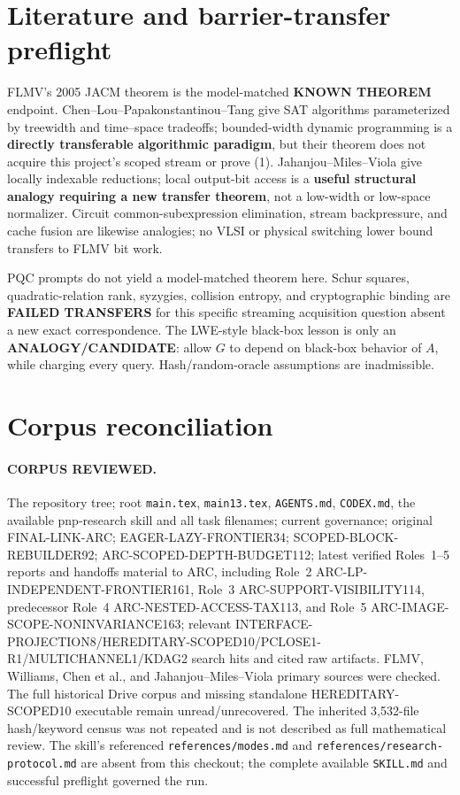\documentclass[11pt]{article}
\begin{document}
\section{Literature and barrier-transfer preflight}
FLMV's 2005 JACM theorem is the model-matched \textbf{KNOWN THEOREM} endpoint.
Chen--Lou--Papakonstantinou--Tang give SAT algorithms parameterized by
treewidth and time--space tradeoffs; bounded-width dynamic programming is a
\textbf{directly transferable algorithmic paradigm}, but their theorem does
not acquire this project's scoped stream or prove (1).  Jahanjou--Miles--Viola
give locally indexable reductions; local output-bit access is a
\textbf{useful structural analogy requiring a new transfer theorem}, not a
low-width or low-space normalizer.  Circuit common-subexpression elimination,
stream backpressure, and cache fusion are likewise analogies; no VLSI or
physical switching lower bound transfers to FLMV bit work.

PQC prompts do not yield a model-matched theorem here.  Schur squares,
quadratic-relation rank, syzygies, collision entropy, and cryptographic
binding are \textbf{FAILED TRANSFERS} for this specific streaming acquisition
question absent a new exact correspondence.  The LWE-style black-box lesson
is only an \textbf{ANALOGY/CANDIDATE}: allow \(G\) to depend on black-box
behavior of \(A\), while charging every query.  Hash/random-oracle assumptions
are inadmissible.

\section{Corpus reconciliation}
\paragraph{CORPUS REVIEWED.}
The repository tree; root \texttt{main.tex}, \texttt{main13.tex},
\texttt{AGENTS.md}, \texttt{CODEX.md}, the available pnp-research skill and
all task filenames; current governance; original FINAL-LINK-ARC;
EAGER-LAZY-FRONTIER34; SCOPED-BLOCK-REBUILDER92;
ARC-SCOPED-DEPTH-BUDGET112; latest verified Roles~1--5 reports and handoffs
material to ARC, including Role~2 ARC-LP-INDEPENDENT-FRONTIER161, Role~3
ARC-SUPPORT-VISIBILITY114, predecessor Role~4 ARC-NESTED-ACCESS-TAX113, and
Role~5 ARC-IMAGE-SCOPE-NONINVARIANCE163; relevant
INTERFACE-PROJECTION8/HEREDITARY-SCOPED10/PCLOSE1-R1/MULTICHANNEL1/KDAG2
search hits and cited raw artifacts.  FLMV, Williams, Chen et al., and
Jahanjou--Miles--Viola primary sources were checked.  The full historical
Drive corpus and missing standalone HEREDITARY-SCOPED10 executable remain
unread/unrecovered.  The inherited 3,532-file hash/keyword census was not
repeated and is not described as full mathematical review.  The skill's
referenced \texttt{references/modes.md} and
\texttt{references/research-protocol.md} are absent from this checkout;
the complete available \texttt{SKILL.md} and successful preflight governed
the run.
\end{document}
